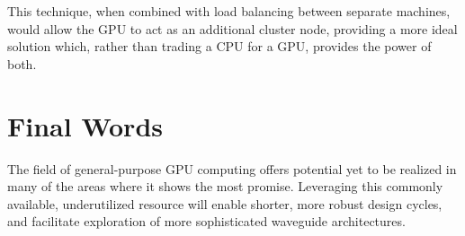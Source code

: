 This technique, when combined with load balancing between separate machines, would allow the GPU to act as an additional cluster node, providing a more ideal solution which, rather than trading a CPU for a GPU, provides the power of both. 


\section{Final Words}

The field of general-purpose GPU computing offers potential yet to be realized in many of the areas where it shows the most promise. Leveraging this commonly available, underutilized resource will enable shorter, more robust design cycles, and facilitate exploration of more sophisticated waveguide architectures. 








